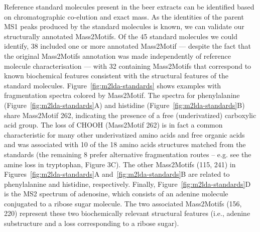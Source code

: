 Reference standard molecules present in the beer extracts can be identified based on chromatographic co-elution and exact mass. As the identities of the parent MS1 peaks produced by the standard molecules is known, we can validate our structurally annotated Mass2Motifs. Of the 45 standard molecules we could identify, 38 included one or more annotated Mass2Motif --- despite the fact that the original Mass2Motifs annotation was made independently of reference molecule characterisation --- with 32 containing Mass2Motifs that correspond to known biochemical features consistent with the structural features of the standard molecules. Figure~\ref{fig:m2lda-standards} shows examples with fragmentation spectra colored by Mass2Motif. The spectra for phenylalanine (Figure~\ref{fig:m2lda-standards}A) and histidine (Figure~\ref{fig:m2lda-standards}B) share Mass2Motif 262, indicating the presence of a free (underivatized) carboxylic acid group. The loss of CHOOH (Mass2Motif 262) is in fact a common characteristic for many other underivatized amino acids and free organic acids and was associated with 10 of the 18 amino acids structures matched from the standards (the remaining 8 prefer alternative fragmentation routes – e.g. see the amine loss in tryptophan, Figure 3C). The other Mass2Motifs (115, 241) in Figures~\ref{fig:m2lda-standards}A and~\ref{fig:m2lda-standards}B are related to phenylalanine and histidine, respectively. Finally, Figure~\ref{fig:m2lda-standards}D is the MS2 spectrum of adenosine, which consists of an adenine molecule conjugated to a ribose sugar molecule. The two associated Mass2Motifs (156, 220) represent these two biochemically relevant structural features (i.e., adenine substructure and a loss corresponding to a ribose sugar).  



